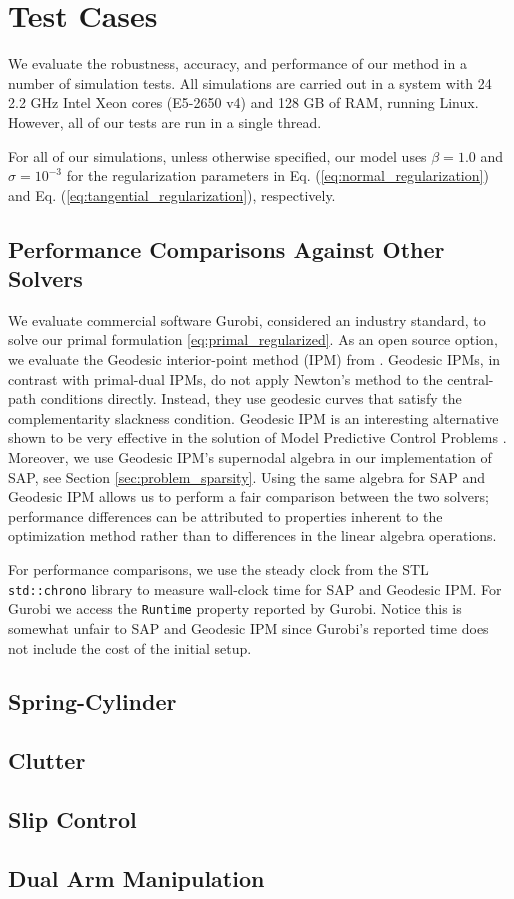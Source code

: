 \section{Test Cases}
\label{sec:test_cases}

We evaluate the robustness, accuracy, and performance of our method in a number
of simulation tests. All simulations are carried out in a system with 24 2.2 GHz
Intel Xeon cores (E5-2650 v4) and 128 GB of RAM, running Linux. However, all of
our tests are run in a single thread.

For all of our simulations, unless otherwise specified, our model uses
$\beta=1.0$ and $\sigma=10^{-3}$ for the regularization parameters in Eq.
(\ref{eq:normal_regularization}) and Eq. (\ref{eq:tangential_regularization}),
respectively.

\subsection{Performance Comparisons Against Other Solvers}
\label{sec:about_solvers}

We evaluate commercial software Gurobi, considered an industry standard, to
solve our primal formulation \eqref{eq:primal_regularized}. As an open source option, we evaluate the Geodesic interior-point method (IPM)
from \cite{bib:permenter2020}. Geodesic IPMs, in contrast with primal-dual
IPMs, do not apply Newton's method to the central-path conditions directly.
Instead, they use geodesic curves that satisfy the complementarity slackness
condition. Geodesic IPM is an interesting alternative shown to be very effective
in the solution of Model Predictive Control Problems \cite{bib:permenter2020}.
Moreover, we use Geodesic IPM's supernodal algebra in our implementation of SAP,
see Section \ref{sec:problem_sparsity}. Using the same
algebra for SAP and Geodesic IPM allows us to perform a fair comparison between
the two solvers; performance differences can be attributed to properties
inherent to the optimization method rather than to differences in the linear
algebra operations.

For performance comparisons, we use the steady clock from the STL
\verb+std::chrono+ library to measure wall-clock time for SAP and Geodesic IPM.
For Gurobi we access the \verb+Runtime+ property reported by Gurobi. Notice this
is somewhat unfair to SAP and Geodesic IPM since Gurobi's reported time does not
include the cost of the initial setup.

\subsection{Spring-Cylinder}
\label{sec:spring_cylinder}


\subsection{Clutter}
\label{sec:clutter}


\subsection{Slip Control}
\label{sec:slip_control}


\subsection{Dual Arm Manipulation}
\label{sec:dual_arm}

